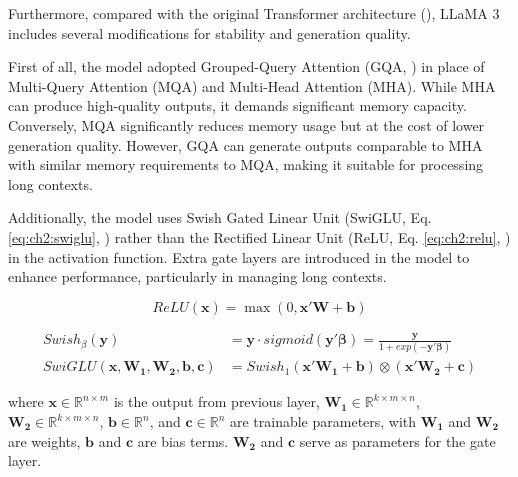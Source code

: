 Furthermore, compared with the original Transformer architecture (\cite{vaswani-etal2018}), LLaMA 3 includes several modifications for stability and generation quality.

First of all, the model adopted Grouped-Query Attention (GQA, \cite{ainslie2023gqa}) in place of Multi-Query Attention (MQA) and Multi-Head Attention (MHA). While MHA can produce high-quality outputs, it demands significant memory capacity. Conversely, MQA significantly reduces memory usage but at the cost of lower generation quality. However, GQA can generate outputs comparable to MHA with similar memory requirements to MQA, making it suitable for processing long contexts.

Additionally, the model uses Swish Gated Linear Unit (SwiGLU, Eq. \eqref{eq:ch2:swiglu}, \cite{shazeer2020glu}) rather than the Rectified Linear Unit (ReLU, Eq. \eqref{eq:ch2:relu}, \cite{glorot2011deep}) in the activation function. Extra gate layers are introduced in the model to enhance performance, particularly in managing long contexts.



\begin{equation}\label{eq:ch2:relu}
    ReLU (\mathbf {x} )=\max(0,\mathbf {x} '\mathbf{W} + \mathbf{b})
\end{equation}


\begin{equation}\label{eq:ch2:swiglu}
    \begin{split}
        Swish_{\beta}(\mathbf{y}) &= \mathbf{y} \cdot sigmoid(\mathbf{y}' \mathbf{\beta}) = \frac{\mathbf{y}}{1 + exp(-\mathbf{y}' \mathbf{\beta})} \\
        SwiGLU(\mathbf{x}, \mathbf{W_1}, \mathbf{W_2}, \mathbf{b}, \mathbf{c}) &= Swish_{1}(\mathbf{x}' \mathbf{W_1} + \mathbf{b}) \otimes (\mathbf{x}' \mathbf{W_2} + \mathbf{c})
    \end{split}
\end{equation}


where $\mathbf{x} \in \mathbb{R}^{n \times m}$ is the output from previous layer, $\mathbf{W_1} \in \mathbb{R}^{k \times m \times n}$, $\mathbf{W_2} \in \mathbb{R}^{k \times m \times n}$, $\mathbf{b} \in \mathbb{R}^{n}$, and $\mathbf{c} \in \mathbb{R}^{n}$ are trainable parameters, with $\mathbf{W_1}$ and $\mathbf{W_2}$ are weights, $\mathbf{b}$ and $\mathbf{c}$ are bias terms. $\mathbf{W_2}$ and $\mathbf{c}$ serve as parameters for the gate layer.





